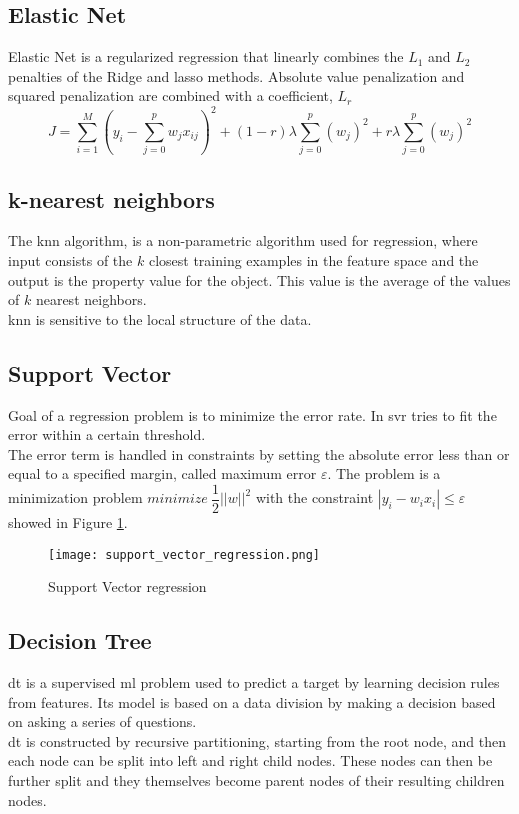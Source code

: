 \subsection{Elastic Net}
Elastic Net is a regularized regression that linearly combines the $L_1$ and $L_2$ penalties of the Ridge and \gls{lasso} methods. Absolute value penalization and squared penalization are combined with a coefficient, $L_{r}$
\begin{equation}
	J=\sum_{i=1}^{M}{{ \left( y_i-\sum_{j=0}^{p}{w_jx_{ij}} \right) }^2}+(1-r) \lambda \sum_{j=0}^{p}{{(w_j)}^2}+r \lambda \sum_{j=0}^{p}{{(w_j)}^2}
\end{equation}\label{elasticnet_eq}

\subsection{k-nearest neighbors}
The \gls{knn} algorithm, is a non-parametric algorithm used for regression, where input consists of the $k$ closest training examples in the feature space and the output is the property value for the object. This value is the average of the values of $k$ nearest neighbors.
\\
\gls{knn} is sensitive to the local structure of the data.

\subsection{Support Vector}
Goal of a regression problem is to minimize the error rate. In \gls{svr} tries to fit the error within a certain threshold.
\\
The error term is handled in constraints by setting the absolute error less than or equal to a specified margin, called maximum error $\varepsilon$. The problem is a minimization problem $minimize \: \dfrac{1}{2}||w||^2$ with the constraint $|y_i-w_ix_i| \leq \varepsilon$ showed in Figure \ref{fig:support_vector_regression}.
\begin{figure}[h]
    \centering
    \texttt{[image: support\_vector\_regression.png]} 
	\caption{Support Vector regression}
    \label{fig:support_vector_regression}
\end{figure} 

\subsection{Decision Tree}
\gls{dt} is a supervised \gls{ml} problem used to predict a target by learning decision rules from features. Its model is based on a data division by making a decision based on asking a series of questions.
\\ \indent
\gls{dt} is constructed by recursive partitioning, starting from the root node, and then each node can be split into left and right child nodes. These nodes can then be further split and they themselves become parent nodes of their resulting children nodes.


